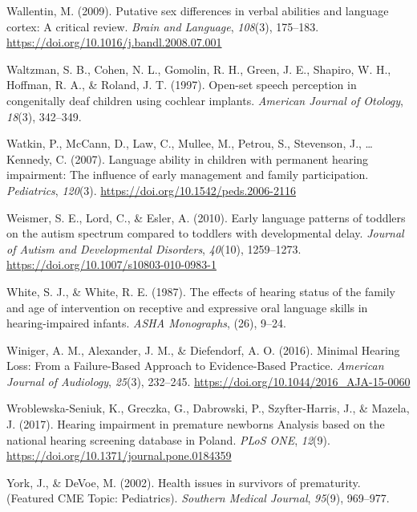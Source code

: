 \documentclass[
  english,
  man]{apa6}
\begin{document}
\leavevmode\hypertarget{ref-wallentin2009}{}%
Wallentin, M. (2009). Putative sex differences in verbal abilities and language cortex: A critical review. \emph{Brain and Language}, \emph{108}(3), 175--183. \url{https://doi.org/10.1016/j.bandl.2008.07.001}

\leavevmode\hypertarget{ref-waltzman1997}{}%
Waltzman, S. B., Cohen, N. L., Gomolin, R. H., Green, J. E., Shapiro, W. H., Hoffman, R. A., \& Roland, J. T. (1997). Open-set speech perception in congenitally deaf children using cochlear implants. \emph{American Journal of Otology}, \emph{18}(3), 342--349.

\leavevmode\hypertarget{ref-watkin2007}{}%
Watkin, P., McCann, D., Law, C., Mullee, M., Petrou, S., Stevenson, J., \ldots{} Kennedy, C. (2007). Language ability in children with permanent hearing impairment: The influence of early management and family participation. \emph{Pediatrics}, \emph{120}(3). \url{https://doi.org/10.1542/peds.2006-2116}

\leavevmode\hypertarget{ref-weismer2010}{}%
Weismer, S. E., Lord, C., \& Esler, A. (2010). Early language patterns of toddlers on the autism spectrum compared to toddlers with developmental delay. \emph{Journal of Autism and Developmental Disorders}, \emph{40}(10), 1259--1273. \url{https://doi.org/10.1007/s10803-010-0983-1}

\leavevmode\hypertarget{ref-white1987}{}%
White, S. J., \& White, R. E. (1987). The effects of hearing status of the family and age of intervention on receptive and expressive oral language skills in hearing-impaired infants. \emph{ASHA Monographs}, (26), 9--24.

\leavevmode\hypertarget{ref-winiger2016}{}%
Winiger, A. M., Alexander, J. M., \& Diefendorf, A. O. (2016). Minimal Hearing Loss: From a Failure-Based Approach to Evidence-Based Practice. \emph{American Journal of Audiology}, \emph{25}(3), 232--245. \url{https://doi.org/10.1044/2016_AJA-15-0060}

\leavevmode\hypertarget{ref-wroblewska-seniuk2017}{}%
Wroblewska-Seniuk, K., Greczka, G., Dabrowski, P., Szyfter-Harris, J., \& Mazela, J. (2017). Hearing impairment in premature newborns Analysis based on the national hearing screening database in Poland. \emph{PLoS ONE}, \emph{12}(9). \url{https://doi.org/10.1371/journal.pone.0184359}

\leavevmode\hypertarget{ref-york2002}{}%
York, J., \& DeVoe, M. (2002). Health issues in survivors of prematurity. (Featured CME Topic: Pediatrics). \emph{Southern Medical Journal}, \emph{95}(9), 969--977.
\end{document}
